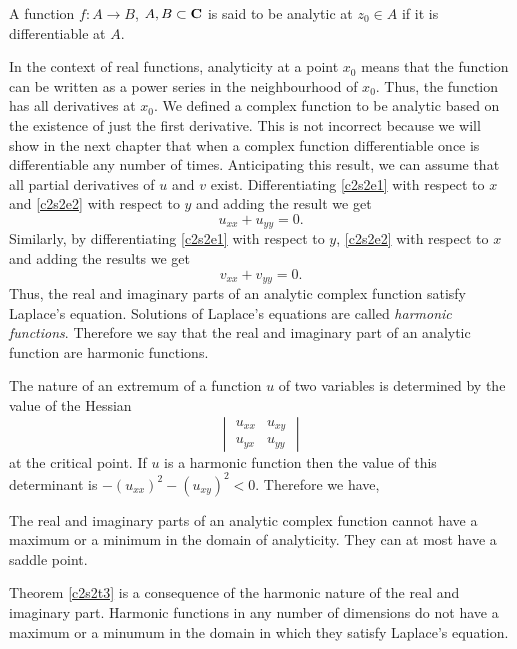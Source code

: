 \begin{defn}\label{c2s2d1}
A function $f:A \rightarrow B$, $A, B \subset \mathbf{C}$ is said to be analytic at
$z_0 \in A$ if it is differentiable at $A$. 
\end{defn}

In the context of real functions, analyticity at a point $x_0$ means that the
function can be written as a power series in the neighbourhood of $x_0$. Thus,
the function has all derivatives at $x_0$. We defined a complex function to
be analytic based on the existence of just the first derivative. This is not
incorrect because we will show in the next chapter that when a complex function
differentiable once is differentiable any number of times. Anticipating this
result, we can assume that all partial derivatives of $u$ and $v$ exist.
Differentiating \eqref{c2s2e1} with respect to $x$ and \eqref{c2s2e2} with
respect to $y$ and adding the result we get
\begin{equation}\label{c2s2e3}
u_{xx} + u_{yy} = 0.
\end{equation}
Similarly, by differentiating \eqref{c2s2e1} with respect to $y$, \eqref{c2s2e2}
with respect to $x$ and adding the results we get
\begin{equation}\label{c2s2e4}
v_{xx} + v_{yy} = 0.
\end{equation}
Thus, the real and imaginary parts of an analytic complex function satisfy
Laplace's equation. Solutions of Laplace's equations are called \emph{harmonic
functions}. Therefore we say that the real and imaginary part of an analytic
function are harmonic functions.

The nature of an extremum of a function $u$ of two variables is determined by 
the value of the Hessian 
\[
\begin{vmatrix} u_{xx} & u_{xy} \\ u_{yx} & u_{yy} \end{vmatrix}
\]
at the critical point. If $u$ is a harmonic function then the value of
this determinant is $-(u_{xx})^2 - (u_{xy})^2 < 0$. Therefore we have,
\begin{thm}\label{c2s2t3}
The real and imaginary parts of an analytic complex function cannot have a 
maximum or a minimum in the domain of analyticity. They can at most have a 
saddle point.
\end{thm}

\begin{rem}
Theorem \ref{c2s2t3} is a consequence of the harmonic nature of the real and
imaginary part. Harmonic functions in any number of dimensions do not have
a maximum or a minumum in the domain in which they satisfy Laplace's equation.
\end{rem}


